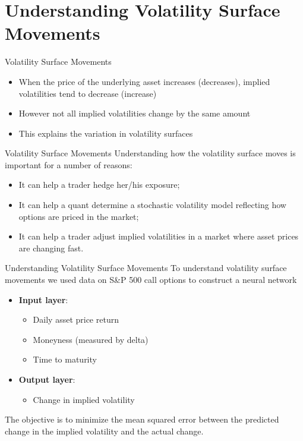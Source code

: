 \documentclass[11pt]{beamer}
\begin{document}
\section{Understanding Volatility Surface Movements}
\begin{frame}{Volatility Surface Movements}
\begin{itemize}
\item When the price of the underlying asset increases (decreases), implied volatilities tend to decrease (increase)
\item However not all implied volatilities change by the same amount
\item This explains the variation in volatility surfaces
\end{itemize}
\end{frame}
\begin{frame}{Volatility Surface Movements}
Understanding how the volatility surface moves is important
for a number of reasons:
	\begin{itemize}
		\item It can help a trader hedge her/his exposure;
		\item It can help a quant determine a stochastic volatility model reflecting
how options are priced in the market;
		\item It can help a trader adjust implied volatilities in a market where
asset prices are changing fast.
	\end{itemize}
\end{frame}
\begin{frame}{Understanding Volatility Surface Movements}
To understand volatility surface movements we used data on S\&P 500 call options to construct a neural network
	\begin{itemize}
		\item \textbf{Input layer}:
		\begin{itemize}
		\item Daily asset price return
		\item Moneyness (measured by delta)
		\item Time to maturity
		\end{itemize}
		\item \textbf{Output layer}:
		\begin{itemize}
		\item Change in implied volatility
		\end{itemize}
	\end{itemize}
	The objective is to
minimize the mean squared error between the predicted change in the
implied volatility and the actual change.
\end{frame}
\end{document}
